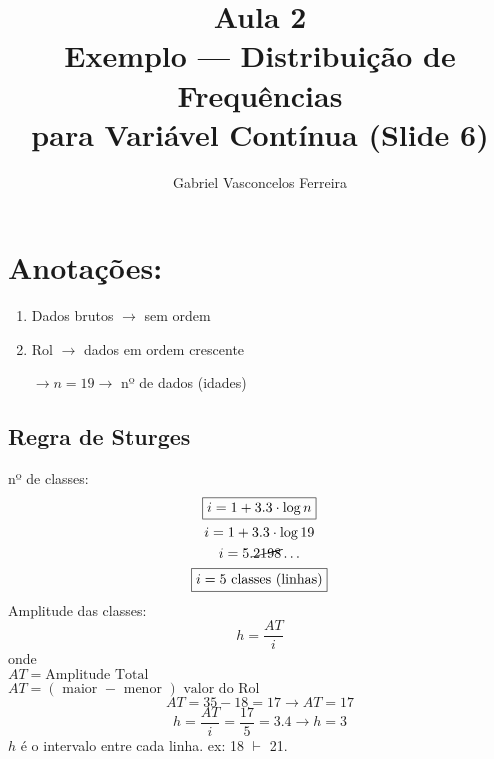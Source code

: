 \documentclass{jhwhw}
\begin{document}
\author{Gabriel Vasconcelos Ferreira}
\title{%
    Aula 2 \\ 
    \large Exemplo --- Distribuição de Frequências \\para Variável Contínua (Slide 6)\\
}
\maketitle    
\chapter{Anotações:}\label{chap:Anotações:} %
\begin{enumerate}
    \item Dados brutos $\rightarrow$ sem ordem
    \item Rol $\rightarrow$ dados em ordem crescente
    \begin{center}
         $\rightarrow n = 19 \rightarrow$ 
    nº de dados (idades)
    \end{center}
\end{enumerate}

\section{Regra de Sturges}
nº de classes:
\begin{multline*}
    \boxed{i = 1 + 3.3 \cdot \log{n}}\\
    i = 1 + 3.3 \cdot \log{19}\\
    i = 5.\cancel{2198}\ldots\\
    \boxed{i = 5 \text{ classes (linhas)}}
\end{multline*}
Amplitude das classes:
\[
    h = \frac{AT}{i}
\]
onde \\$AT = \text{Amplitude Total}$\\
$AT = (\text{ maior } - \text{ menor }) \text{ valor do Rol}$
\[
    AT = 35 - 18 = 17 \rightarrow \boxed{AT = 17}
\]
\[
    h = \frac{AT}{i} = \frac{17}{5} = 3.4 \rightarrow \boxed{h = 3}
\]
$h$ é o intervalo entre cada linha. ex: 18 $\vdash$ 21.
\end{document}
